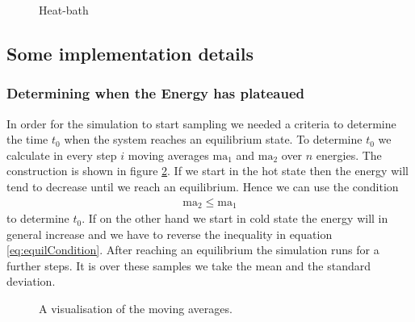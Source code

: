 \begin{figure}
\centering
\begin{algorithm}[H]
\caption{Heat-bath}
\label{alg:heat-bath}

\BlankLine
{}
\end{algorithm}
\end{figure}

\subsection{Some implementation details}

\subsubsection{Determining when the Energy has plateaued}

In order for the simulation to start sampling we needed a criteria to determine the time $t_0$ when the system reaches an equilibrium state.
 To determine $t_0$ we calculate in every step $i$ moving averages $\text{ma}_1$ and $\text{ma}_2$ over $n$ energies. The construction is shown in figure \ref{fi:movingAverages}. If we start in the hot state then the energy will tend to decrease until we reach an equilibrium. Hence we can use the condition
\begin{align}
	\text{ma}_2 \leq \text{ma}_1 \label{eq:equilCondition}
\end{align}
to determine $t_0$. If on the other hand we start in cold state the energy will in general increase and we have to reverse the inequality in equation \eqref{eq:equilCondition}. After reaching an equilibrium the simulation runs for a further  steps. It is over these samples we take the mean and the standard deviation.

\begin{figure}
\centering

\caption{A visualisation of the moving averages.}
\label{fi:movingAverages}
\end{figure}

